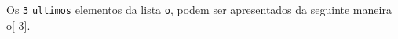 \documentclass[12pt,varwidth=16cm,border=1pt]{standalone}
\begin{document}
Os \verb+3+ \verb+ultimos+ elementos da lista \verb+o+, podem ser apresentados da seguinte maneira o[-3].

\questiomfalse
\end{document}
